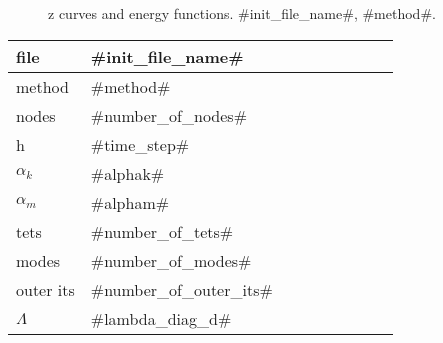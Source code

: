 

\begin{figure}
  \centering
  \caption{z curves and energy functions. #init_file_name#, #method#.}
  \label{en_f}
\end{figure}

\begin{center}
  \begin{tabular}{|l*{8}{|l}}
    \hline
	file & #init_file_name# \\ \hline
	method & #method# \\ \hline
	nodes & #number_of_nodes# \\ \hline
	h & #time_step# \\ \hline
	$\alpha_k$ & #alphak# \\ \hline
	$\alpha_m$ & #alpham# \\ \hline
	tets & #number_of_tets# \\ \hline
	modes & #number_of_modes# \\ \hline
    outer its & #number_of_outer_its# \\ \hline
	$\Lambda$ &  #lambda_diag_d# 
  \end{tabular}
\end{center}
